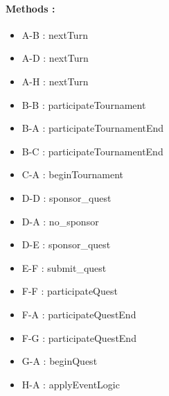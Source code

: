 \documentclass{article}
\begin{document}
\paragraph{Methods :}
\begin{itemize}
\item A-B : nextTurn
\item A-D : nextTurn
\item A-H : nextTurn
\item B-B : participateTournament
\item B-A : participateTournamentEnd
\item B-C : participateTournamentEnd
\item C-A : beginTournament
\item D-D : sponsor\_quest
\item D-A : no\_sponsor
\item D-E : sponsor\_quest
\item E-F : submit\_quest
\item F-F : participateQuest
\item F-A : participateQuestEnd
\item F-G : participateQuestEnd
\item G-A : beginQuest
\item H-A : applyEventLogic
\end{itemize}

  
\end{document}
